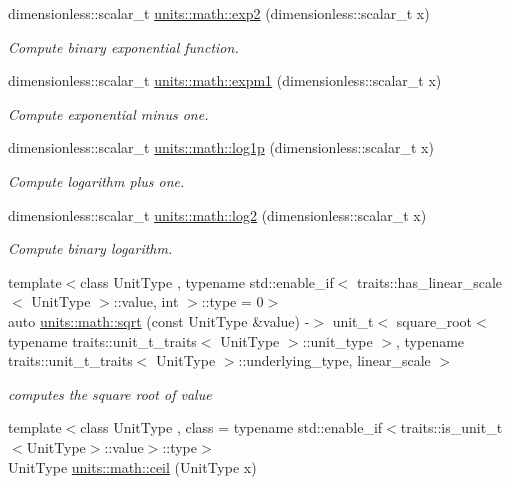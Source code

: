 \begin{DoxyCompactItemize}
dimensionless\+::scalar\+\_\+t \hyperlink{group___unit_math_ga2567044806581efac6543d0f0eadfd6f}{units\+::math\+::exp2} (dimensionless\+::scalar\+\_\+t x)
\begin{DoxyCompactList}\small\item\em Compute binary exponential function. \end{DoxyCompactList}\item 
dimensionless\+::scalar\+\_\+t \hyperlink{group___unit_math_ga902e7c7a2b43eb88b3695e458fd5be7f}{units\+::math\+::expm1} (dimensionless\+::scalar\+\_\+t x)
\begin{DoxyCompactList}\small\item\em Compute exponential minus one. \end{DoxyCompactList}\item 
dimensionless\+::scalar\+\_\+t \hyperlink{group___unit_math_ga8efe4c7b9d7f4377aa25d2d4aac13cec}{units\+::math\+::log1p} (dimensionless\+::scalar\+\_\+t x)
\begin{DoxyCompactList}\small\item\em Compute logarithm plus one. \end{DoxyCompactList}\item 
dimensionless\+::scalar\+\_\+t \hyperlink{group___unit_math_ga74cfc8bb50857982dc6eac6825295a0a}{units\+::math\+::log2} (dimensionless\+::scalar\+\_\+t x)
\begin{DoxyCompactList}\small\item\em Compute binary logarithm. \end{DoxyCompactList}\item 
{\footnotesize template$<$class Unit\+Type , typename std\+::enable\+\_\+if$<$ traits\+::has\+\_\+linear\+\_\+scale$<$ Unit\+Type $>$\+::value, int $>$\+::type  = 0$>$ }\\auto \hyperlink{group___unit_math_gabfa4684a203331f788cf8294fdc25c7a}{units\+::math\+::sqrt} (const Unit\+Type \&value) -\/$>$ unit\+\_\+t$<$ square\+\_\+root$<$ typename traits\+::unit\+\_\+t\+\_\+traits$<$ Unit\+Type $>$\+::unit\+\_\+type $>$, typename traits\+::unit\+\_\+t\+\_\+traits$<$ Unit\+Type $>$\+::underlying\+\_\+type, linear\+\_\+scale $>$
\begin{DoxyCompactList}\small\item\em computes the square root of {\itshape value} \end{DoxyCompactList}\item 
{\footnotesize template$<$class Unit\+Type , class  = typename std\+::enable\+\_\+if$<$traits\+::is\+\_\+unit\+\_\+t$<$\+Unit\+Type$>$\+::value$>$\+::type$>$ }\\Unit\+Type \hyperlink{group___unit_math_gac69d26861d77b33df6a8bdff8e3adcf9}{units\+::math\+::ceil} (Unit\+Type x)

\end{DoxyCompactItemize}

